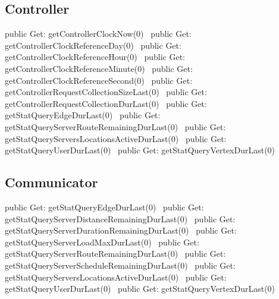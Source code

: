 \subsection{Controller}
\nwenddocs{}\plusendmoddef
public \LA{}Get: getControllerClockNow(0)~{\nwtagstyle{}}\RA{}
public \LA{}Get: getControllerClockReferenceDay(0)~{\nwtagstyle{}}\RA{}
public \LA{}Get: getControllerClockReferenceHour(0)~{\nwtagstyle{}}\RA{}
public \LA{}Get: getControllerClockReferenceMinute(0)~{\nwtagstyle{}}\RA{}
public \LA{}Get: getControllerClockReferenceSecond(0)~{\nwtagstyle{}}\RA{}
public \LA{}Get: getControllerRequestCollectionSizeLast(0)~{\nwtagstyle{}}\RA{}
public \LA{}Get: getControllerRequestCollectionDurLast(0)~{\nwtagstyle{}}\RA{}
public \LA{}Get: getStatQueryEdgeDurLast(0)~{\nwtagstyle{}}\RA{}
public \LA{}Get: getStatQueryServerRouteRemainingDurLast(0)~{\nwtagstyle{}}\RA{}
public \LA{}Get: getStatQueryServersLocationsActiveDurLast(0)~{\nwtagstyle{}}\RA{}
public \LA{}Get: getStatQueryUserDurLast(0)~{\nwtagstyle{}}\RA{}
public \LA{}Get: getStatQueryVertexDurLast(0)~{\nwtagstyle{}}\RA{}
\nwendcode{}\nwdocspar

\subsection{Communicator}
\nwenddocs{}\plusendmoddef
public \LA{}Get: getStatQueryEdgeDurLast(0)~{\nwtagstyle{}}\RA{}
public \LA{}Get: getStatQueryServerDistanceRemainingDurLast(0)~{\nwtagstyle{}}\RA{}
public \LA{}Get: getStatQueryServerDurationRemainingDurLast(0)~{\nwtagstyle{}}\RA{}
public \LA{}Get: getStatQueryServerLoadMaxDurLast(0)~{\nwtagstyle{}}\RA{}
public \LA{}Get: getStatQueryServerRouteRemainingDurLast(0)~{\nwtagstyle{}}\RA{}
public \LA{}Get: getStatQueryServerScheduleRemainingDurLast(0)~{\nwtagstyle{}}\RA{}
public \LA{}Get: getStatQueryServersLocationsActiveDurLast(0)~{\nwtagstyle{}}\RA{}
public \LA{}Get: getStatQueryUserDurLast(0)~{\nwtagstyle{}}\RA{}
public \LA{}Get: getStatQueryVertexDurLast(0)~{\nwtagstyle{}}\RA{}
\nwendcode{}\nwdocspar


